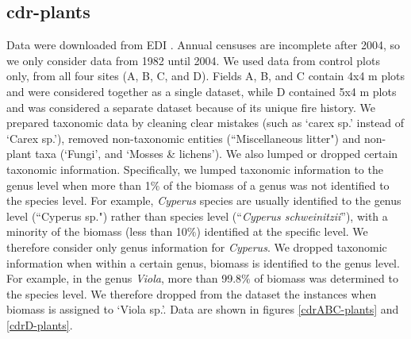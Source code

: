 \documentclass[11pt, oneside]{article}
\begin{document}
\subsection {cdr-plants}
Data were downloaded from EDI \citep{cdr-plants}.
Annual censuses are incomplete after 2004, so we only consider data from 1982 until 2004. 
We used data from control plots only, from all four sites (A, B, C, and D). 
Fields A, B, and C contain 4x4 m plots and were considered together as a single dataset, while D contained 5x4 m plots and was considered a separate dataset because of its unique fire history.
We prepared taxonomic data by cleaning clear mistakes (such as `carex sp.' instead of `Carex sp.'), removed non-taxonomic entities (``Miscellaneous litter") and non-plant taxa (`Fungi', and `Mosses \& lichens').
We also lumped or dropped certain taxonomic information. 
Specifically, we lumped taxonomic information to the genus level when more than 1$\%$ of the biomass of a genus was not identified to the species level. 
For example, {\it Cyperus} species are usually identified to the genus level (``Cyperus  sp.") rather than species level (``{\it Cyperus schweinitzii}''), with a minority of the biomass (less than 10$\%$) identified at the specific level. 
We therefore consider only genus information for {\it Cyperus}. 
We dropped taxonomic information when within a certain genus, biomass is identified to the genus level. 
For example, in the genus {\it Viola}, more than 99.8$\%$ of biomass was determined to the species level. We therefore dropped from the dataset the instances when biomass is assigned to `Viola sp.'.
Data are shown in figures \ref{cdrABC-plants} and \ref{cdrD-plants}.
\end{document}
